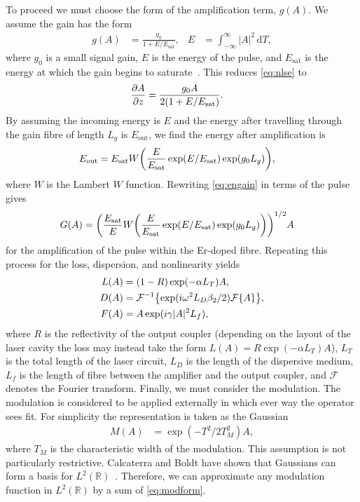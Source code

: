 \documentclass[9pt,twocolumn,twoside]{osajnl}
\let\originalleft\left
\let\originalright\right
\renewcommand{\left}{\mathopen{}\mathclose\bgroup\originalleft}
\renewcommand{\right}{\aftergroup\egroup\originalright}
\providecommand{\df}{\textrm{d}} %
\newcommand{\pdiff}[3][\hspace{-0.5pt}]{\frac{\partial^{#1}#2}{\partial{#3}^{#1}}} %
\newcommand{\Es}{E_{\textrm{sat}}} %
\newcommand{\FT}[1]{\mathcal{F}\left\{ #1 \right\}} %
\newcommand{\FTi}[1]{\mathcal{F}^{-1}\left\{ #1 \right\}} %
\begin{document}
To proceed we must choose the form of the amplification term, $g(A)$. We assume the gain has the form
\begin{align}
	g(A) &= \frac{g_0}{1 + E / \Es},& E &= \int_{-\infty}^\infty |A|^2 \, \df T,
	\label{eq:energy}
\end{align}
where $g_0$ is a small signal gain, $E$ is the energy of the pulse, and $\Es$ is the energy at which the gain begins to saturate~\cite{haus1984, shtyrina2017, silfvast2004}. This reduces \eqref{eq:nlse} to
\begin{align}
	\pdiff{A}{z} &= \frac{g_0 A}{2 \left( 1 + E / \Es \right)}.
\end{align}
By assuming the incoming energy is $E$ and the energy after travelling through the gain fibre of length $L_g$ is $E_{\text{out}}$, we find the energy after amplification is
\begin{align}
	\label{eq:engain}
	E_{\text{out}} &= \Es W \left( \frac{E}{\Es} \exp( E / \Es ) \exp( g_0 L_g ) \right),
\end{align}
where $W$ is the Lambert $W$ function. Rewriting \eqref{eq:engain} in terms of the pulse gives
\begin{align}
	G(A) &= \left( \frac{\Es}{E} W \left( \frac{E}{\Es} \exp( E / \Es ) \exp( g_0 L_g ) \right) \right)^{1/2} A
	\label{eq:gainform}
\end{align}
for the amplification of the pulse within the Er-doped fibre. Repeating this process for the loss, dispersion, and nonlinearity yields
\begin{align}
	L(A) &= (1 - R) \exp( - \alpha L_T )A, \\
	D(A) &= \FTi{\exp( i \omega^2 L_D\beta_2/2 ) \FT{A}}, \\
	F(A) &= A \exp( i \gamma |A|^2 L_f ),
\end{align}
where $R$ is the reflectivity of the output coupler (depending on the layout of the laser cavity the loss may instead take the form $L(A) = R \exp( - \alpha L_T )A$), $L_T$ is the total length of the laser circuit, $L_D$ is the length of the dispersive medium, $L_f$ is the length of fibre between the amplifier and the output coupler, and $\mathcal{F}$ denotes the Fourier transform. Finally, we must consider the modulation. The modulation is considered to be applied externally in which ever way the operator sees fit. For simplicity the representation is taken as the Gaussian
\begin{align}
	M(A) &= \exp( -T^2 / 2 T_M^2 ) A,
	\label{eq:modform}
\end{align}
where $T_M$ is the characteristic width of the modulation. This assumption is not particularly restrictive. Calcaterra and Boldt have shown that Gaussians can form a basis for $L^2(\mathbb{R})$~\cite{calcaterra2008a}. Therefore, we can approximate any modulation function in $L^2(\mathbb{R})$ by a sum of \eqref{eq:modform}.
\end{document}
